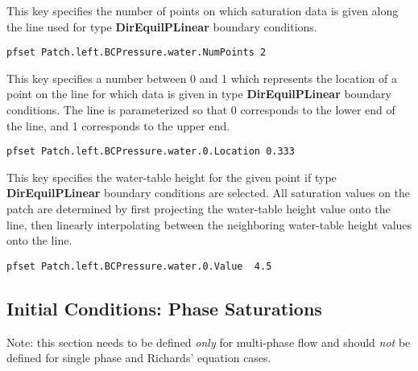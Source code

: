 {
This key specifies the number of points on which saturation data is
given along the line used for type {\bf DirEquilPLinear} boundary
conditions.
}
\begin{display}\begin{verbatim}
pfset Patch.left.BCPressure.water.NumPoints 2
\end{verbatim}\end{display}

{
This key specifies a number between 0 and 1 which represents the
location of a point on the line for which data is given in type
{\bf DirEquilPLinear} boundary conditions.  The line is parameterized
so that  0 corresponds to the lower end of the line, and 1 corresponds
to the upper end.
}
\begin{display}\begin{verbatim}
pfset Patch.left.BCPressure.water.0.Location 0.333
\end{verbatim}\end{display}

{
This key specifies the water-table height for the given point if type
{\bf DirEquilPLinear} boundary conditions are selected.  All saturation
values on the patch are determined by first projecting the water-table 
height value onto the line, then linearly interpolating between the
neighboring water-table height values onto the line.
}
\begin{display}\begin{verbatim}
pfset Patch.left.BCPressure.water.0.Value  4.5
\end{verbatim}\end{display}


\subsection{Initial Conditions: Phase Saturations}
\label{Initial Conditions: Phase Saturations}

Note: this section needs to be defined {\em only} for multi-phase flow
and should {\em not} be defined for single phase and Richards' equation cases.

